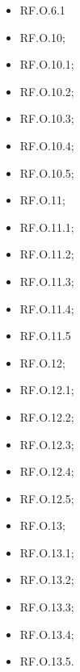 \documentclass[10pt, a4paper]{article}
\begin{document}
\begin{itemize}
   \item  RF.O.6.1 %
    \item RF.O.10; %
    \item RF.O.10.1;%
    \item RF.O.10.2;%
    \item RF.O.10.3;%
    \item RF.O.10.4;%
    \item RF.O.10.5; %
    \item RF.O.11; %
    \item RF.O.11.1;%
    \item RF.O.11.2;%
    \item RF.O.11.3;%
    \item RF.O.11.4;%
    \item RF.O.11.5%
    \item RF.O.12;%
    \item RF.O.12.1;%
    \item RF.O.12.2;%
    \item RF.O.12.3;%
    \item RF.O.12.4;%
    \item RF.O.12.5;%
    \item RF.O.13;%
    \item RF.O.13.1;%
    \item RF.O.13.2;%
    \item RF.O.13.3;%
    \item RF.O.13.4;%
    \item RF.O.13.5.%

\end{itemize}
\end{document}
